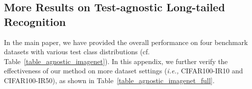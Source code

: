 \documentclass{article}
\def\ie{\emph{i.e.}} \def\Ie{\emph{I.e.}}
\def\ie{\emph{i.e., }}
\begin{document}
  
\begin{table}[h]        \vspace{0.1in}
      \caption{Accuracy on CIFAR10-LT, where the test class distribution is uniform. Most results are directly copied from the work~\cite{zhong2021improving}.}  
      \label{Result_cifar}  
 \begin{center} 
 \begin{threeparttable} 
	 \end{threeparttable}
	 \end{center}   
\end{table} 

\newpage
\subsection{More Results  on Test-agnostic   Long-tailed Recognition}\label{App_D4}
In the main paper, we have  provided the overall performance on four benchmark datasets with various   test class distributions (cf. Table~\ref{table_agnostic_imagenet}). In this appendix, we further verify the effectiveness of our method on     more dataset settings (\ie CIFAR100-IR10 and CIFAR100-IR50), as shown in Table~\ref{table_agnostic_imagenet_full}.
\end{document}
